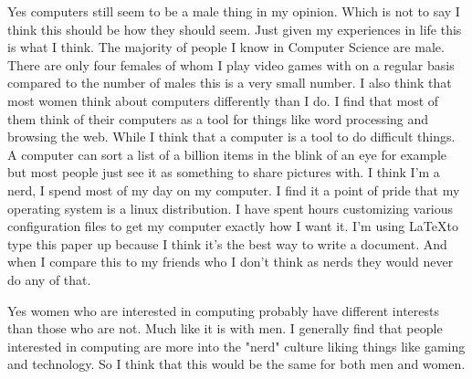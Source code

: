 \documentclass{article}
\begin{document}
Yes computers still seem to be a male thing in my opinion. Which is not to say I
think this should be how they should seem. Just given my experiences in life
this is what I think. The majority of people I know in Computer Science are
male. There are only four females of whom I play video games with on a regular
basis compared to the number of males this is a very small number. I also think
that most women think about computers differently than I do. I find that most of
them think of their computers as a tool for things like word processing and
browsing the web. While I think that a computer is a tool to do difficult
things. A computer can sort a list of a billion items in the blink of an eye for
example but most people just see it as something to share pictures with. I think
I'm a nerd, I spend most of my day on my computer. I find it a point of pride
that my operating system is a linux distribution. I have spent hours customizing
various configuration files to get my computer exactly how I want it. I'm using
\LaTeX to type this paper up because I think it's the best way to write a
document. And when I compare this to my friends who I don't think as nerds they
would never do any of that.

Yes women who are interested in computing probably have different interests than
those who are not. Much like it is with men. I generally find that people
interested in computing are more into the "nerd" culture liking things like
gaming and technology. So I think that this would be the same for both men and
women.
\end{document}
